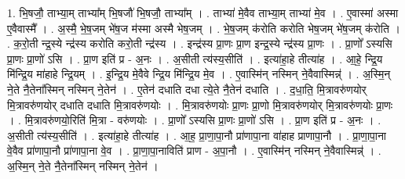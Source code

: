 \documentclass[17pt]{extarticle}
\begin{document}
1. भि॒षजौ॒ ताभ्या॒म् ताभ्या᳚म् भि॒षजौ॑ भि॒षजौ॒ ताभ्या᳚म् । . ताभ्या॑ मे॒वैव ताभ्या॒म् ताभ्या॑ मे॒व । . ए॒वास्मा॑ अस्मा ए॒वैवास्मै᳚ । . अ॒स्मै॒ भे॒ष॒जम् भे॑ष॒ज म॑स्मा अस्मै भेष॒जम् । . भे॒ष॒जम् क॑रोति करोति भेष॒जम् भे॑ष॒जम् क॑रोति । . क॒रो॒ती न्द्र॒स्ये न्द्र॑स्य करोति करो॒ती न्द्र॑स्य । . इन्द्र॑स्य प्रा॒णः प्रा॒ण इन्द्र॒स्ये न्द्र॑स्य प्रा॒णः । . प्रा॒णो᳚ ऽस्यसि प्रा॒णः प्रा॒णो॑ ऽसि । . प्रा॒ण इति॑ प्र - अ॒नः । . अ॒सीती त्य॑स्य॒सीति॑ । . इत्या॑हा॒हे तीत्या॑ह । . आ॒हे॒ न्द्रि॒य मि॑न्द्रि॒य मा॑हाहे न्द्रि॒यम् । . इ॒न्द्रि॒य मे॒वैवे न्द्रि॒य मि॑न्द्रि॒य मे॒व । . ए॒वास्मि॑न् नस्मिन् ने॒वैवास्मिन्न्॑ । . अ॒स्मि॒न् ने॒ते नै॒तेना᳚स्मिन् नस्मिन् ने॒तेन॑ । . ए॒तेन॑ दधाति दधा त्ये॒ते नै॒तेन॑ दधाति । . द॒धा॒ति॒ मि॒त्रावरु॑णयोर् मि॒त्रावरु॑णयोर् दधाति दधाति मि॒त्रावरु॑णयोः । . मि॒त्रावरु॑णयोः प्रा॒णः प्रा॒णो मि॒त्रावरु॑णयोर् मि॒त्रावरु॑णयोः प्रा॒णः । . मि॒त्रावरु॑णयो॒रिति॑ मि॒त्रा - वरु॑णयोः । . प्रा॒णो᳚ ऽस्यसि प्रा॒णः प्रा॒णो॑ ऽसि । . प्रा॒ण इति॑ प्र - अ॒नः । . अ॒सीती त्य॑स्य॒सीति॑ । . इत्या॑हा॒हे तीत्या॑ह । . आ॒ह॒ प्रा॒णा॒पा॒नौ प्रा॑णापा॒ना वा॑हाह प्राणापा॒नौ । . प्रा॒णा॒पा॒ना वे॒वैव प्रा॑णापा॒नौ प्रा॑णापा॒ना वे॒व । . प्रा॒णा॒पा॒नाविति॑ प्राण - अ॒पा॒नौ । . ए॒वास्मि॑न् नस्मिन् ने॒वैवास्मिन्न्॑ । . अ॒स्मि॒न् ने॒ते नै॒तेना᳚स्मिन् नस्मिन् ने॒तेन॑ । \newline
\end{document}
